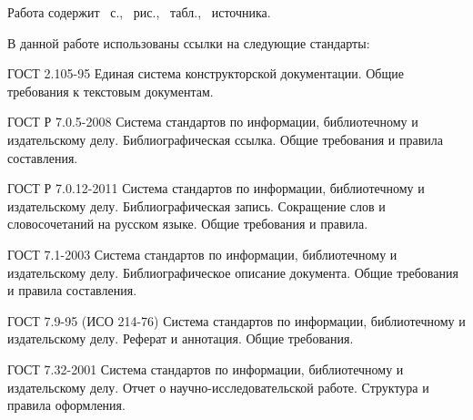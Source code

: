 \documentclass[utf8,12pt, coursreport]{G7-32}
\begin{document}

\frontmatter %



\Referat %

Работа содержит \totalpages{}~с., \totalfigures{}~рис., \totaltables{}~табл., \totalbibs{}~источника.






\tableofcontents

\NormRefs

В данной работе использованы ссылки на следующие стандарты:

ГОСТ 2.105-95 Единая система конструкторской документации. Общие требования к текстовым документам.

ГОСТ Р 7.0.5-2008 Система стандартов по информации, библиотечному и издательскому делу. Библиографическая ссылка. Общие требования и правила составления.

ГОСТ Р 7.0.12-2011 Система стандартов по информации, библиотечному и издательскому делу. Библиографическая запись. Сокращение слов и словосочетаний на русском языке. Общие требования и правила.

ГОСТ 7.1-2003 Система стандартов по информации, библиотечному и издательскому делу. Библиографическое описание документа. Общие требования и правила составления.

ГОСТ 7.9-95 (ИСО 214-76) Система стандартов по информации, библиотечному и издательскому делу. Реферат и аннотация. Общие требования.

ГОСТ 7.32-2001 Система стандартов по информации, библиотечному и издательскому делу. Отчет о научно-исследовательской работе. Структура и правила оформления.
\end{document}
